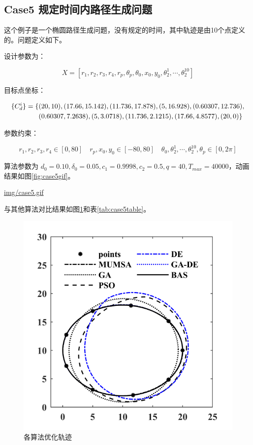 \documentclass[]{ctexbook}
\theoremstyle{definition}
\theoremstyle{definition}
\theoremstyle{definition}
\theoremstyle{remark}
\begin{document}
\subsection{Case5 规定时间内路径生成问题}\label{case5-}

这个例子是一个椭圆路径生成问题，没有规定的时间，其中轨迹是由10个点定义的。问题定义如下。

设计参数为：

\[
X = [r_1,r_2,r_3,r_4,r_p,\theta_p,\theta_0,x_0,y_0,\theta_2^1,\cdots,\theta_2^{10}]
\]

目标点坐标：

\begin{align}
\{C_d^i\} = \{&(20,10),(17.66,15.142),(11.736,17.878),(5,16.928),(0.60307,12.736), \notag \\
&(0.60307,7.2638),(5,3.0718),(11.736,2.1215),(17.66,4.8577),(20,0)\}\notag\\
\end{align}

参数约束：

\[
r_1,r_2,r_3,r_4\in[0,80]\quad r_p,x_0,y_0\in[-80,80]\quad \theta_0,\theta_2^1,\cdots,\theta_2^{10},\theta_p\in[0,2\pi]
\]

算法参数为
\(d_0 = 0.10,\delta_0=0.05,c_1=0.9998,c_2=0.5,q=40,T_{max}=40000\)，动画结果如图\ref{fig:case5gif}。

\url{img/case5.gif}

与其他算法对比结果如图\ref{fig:case5png}和表\ref{tab:case5table}。

\begin{figure}

{\centering \includegraphics[width=0.5\linewidth]{img/case5png} 

}

\caption{各算法优化轨迹}\label{fig:case5png}
\end{figure}
\end{document}
